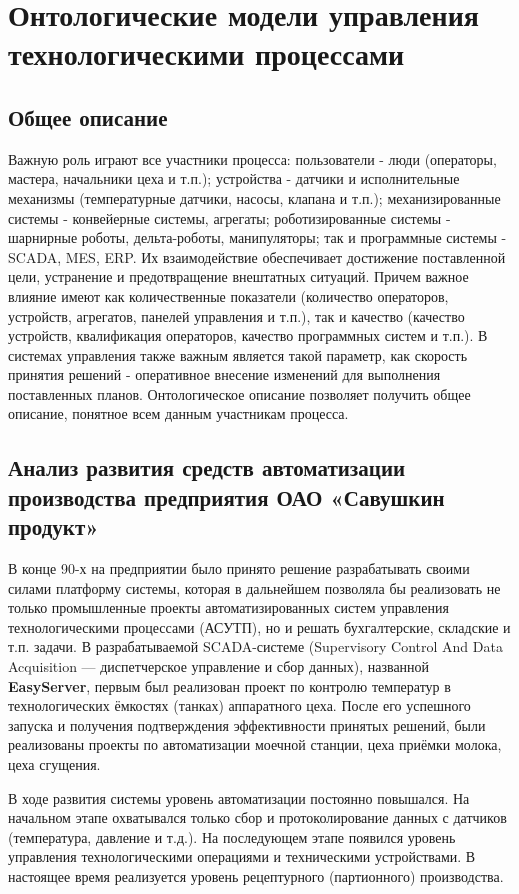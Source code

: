 \chapter{Онтологические модели управления технологическими процессами}

\section{Общее описание}

Важную роль играют все участники процесса: пользователи - люди (операторы, мастера, начальники цеха и т.п.); устройства - датчики и исполнительные механизмы (температурные датчики, насосы, клапана и т.п.); механизированные системы - конвейерные системы, агрегаты; роботизированные системы - шарнирные роботы, дельта-роботы, манипуляторы; так и программные системы - SCADA, MES, ERP. Их взаимодействие обеспечивает достижение поставленной цели, устранение и предотвращение внештатных ситуаций. Причем важное влияние имеют как количественные показатели (количество операторов, устройств, агрегатов, панелей управления и т.п.), так и качество (качество устройств, квалификация операторов, качество программных систем и т.п.). В системах управления также важным является такой параметр, как скорость принятия решений - оперативное внесение изменений для выполнения поставленных планов. Онтологическое описание позволяет получить общее описание, понятное всем данным участникам процесса.

\section{Анализ развития средств автоматизации производства предприятия ОАО
«Савушкин продукт»}

В конце 90-х на предприятии было принято решение разрабатывать своими силами
платформу системы, которая в дальнейшем позволяла бы реализовать не только
промышленные проекты автоматизированных систем управления технологическими
процессами (АСУТП), но и решать бухгалтерские, складские и т.п. задачи. В
разрабатываемой SCADA-системе (Supervisory Control And Data Acquisition —
диспетчерское управление и сбор данных), названной \textbf{EasyServer}, первым
был реализован проект по контролю температур в технологических ёмкостях (танках)
аппаратного цеха. После его успешного запуска и получения подтверждения
эффективности принятых решений, были реализованы проекты по автоматизации
моечной станции, цеха приёмки молока, цеха сгущения.

В ходе развития системы уровень автоматизации постоянно повышался. На начальном
этапе охватывался только сбор и протоколирование данных с датчиков (температура,
давление и т.д.). На последующем этапе появился уровень управления
технологическими операциями и техническими устройствами. В настоящее время
реализуется уровень рецептурного (партионного) производства.


